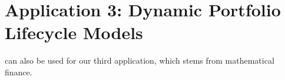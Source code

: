 
\chapter{Application 3: Dynamic Portfolio Lifecycle Models}

can also be used for our third application,
which stems from mathematical finance.
\blindtext{}






\cleardoublepage
